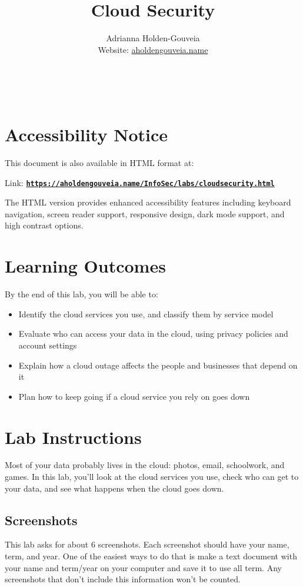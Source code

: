 \documentclass[12pt]{article}
\title{Cloud Security}
\author{
        Adrianna Holden-Gouveia \\
        Website: \href{https://aholdengouveia.name}{aholdengouveia.name}\\ 
        \date{\vspace{-5ex}}
        \faGithub {: aholdengouveia} \\
        \faTwitter {: aholdengouveia} \\
        }
\begin{document}
\maketitle

\section*{Accessibility Notice}
This document is also available in HTML format at:

Link: \href{https://aholdengouveia.name/InfoSec/labs/cloudsecurity.html}{\textbf{\nolinkurl{https://aholdengouveia.name/InfoSec/labs/cloudsecurity.html}}}

The HTML version provides enhanced accessibility features including keyboard navigation, screen reader support, responsive design, dark mode support, and high contrast options.

\section*{Learning Outcomes}
By the end of this lab, you will be able to:
\begin{itemize}
    \item Identify the cloud services you use, and classify them by service model
    \item Evaluate who can access your data in the cloud, using privacy policies and account settings
    \item Explain how a cloud outage affects the people and businesses that depend on it
    \item Plan how to keep going if a cloud service you rely on goes down
\end{itemize}

\section*{Lab Instructions}
Most of your data probably lives in the cloud: photos, email, schoolwork, and games. In this lab, you'll look at the cloud services you use, check who can get to your data, and see what happens when the cloud goes down.

\subsection*{Screenshots}
This lab asks for about 6 screenshots. Each screenshot should have your name, term, and year.  One of the easiest ways to do that is make a text document with your name and term/year on your computer and save it to use all term. Any screenshots that don't include this information won't be counted.
\end{document}
